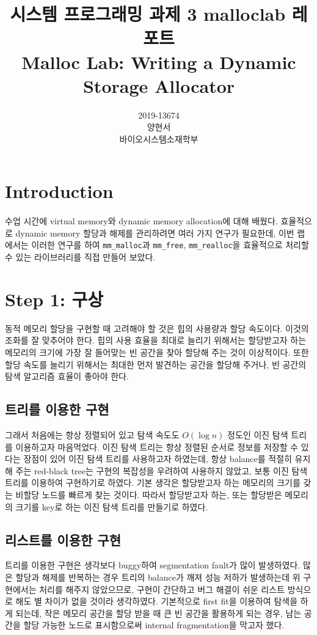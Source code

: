 \documentclass{report}
\title{시스템 프로그래밍 과제 3 malloclab 레포트 \\
\large Malloc Lab: Writing a Dynamic Storage Allocator}
\date{}
\author{
  2019-13674\\
  양현서 \\
  바이오시스템소재학부\\
}
\begin{document}
\maketitle
\tableofcontents

\section{Introduction}
\paragraph{}
 수업 시간에 virtual memory와 dynamic memory allocation에 대해 배웠다. 효율적으로 dynamic memory 할당과 해제를 관리하려면 여러 가지 연구가 필요한데, 이번 랩에서는 이러한 연구를 하여 \lstinline{mm_malloc}과 \lstinline{mm_free}, \lstinline{mm_realloc}을 효율적으로 처리할 수 있는 라이브러리를 직접 만들어 보았다.

\section{Step 1: 구상}
동적 메모리 할당을 구현할 때 고려해야 할 것은 힙의 사용량과 할당 속도이다. 이것의 조화를 잘 맞추어야 한다. 힙의 사용 효율을 최대로 늘리기 위해서는 할당받고자 하는 메모리의 크기에 가장 잘 들어맞는 빈 공간을 찾아 할당해 주는 것이 이상적이다. 또한 할당 속도를 늘리기 위해서는 최대한 먼저 발견하는 공간을 할당해 주거나, 빈 공간의 탐색 알고리즘 효율이 좋아야 한다.
\subsection{트리를 이용한 구현}
그래서 처음에는 항상 정렬되어 있고 탐색 속도도 $O(\log n)$ 정도인 이진 탐색 트리를 이용하고자 마음먹었다. 이진 탐색 트리는 항상 정렬된 순서로 정보를 저장할 수 있다는 장점이 있어 이진 탐색 트리를 사용하고자 하였는데, 항상 balance를 적절히 유지해 주는 red-black tree는 구현의 복잡성을 우려하여 사용하지 않았고, 보통 이진 탐색 트리를 이용하여 구현하기로 하였다. 기본 생각은 할당받고자 하는 메모리의 크기를 갖는 비할당 노드를 빠르게 찾는 것이다. 따라서 할당받고자 하는, 또는 할당받은 메모리의 크기를 key로 하는 이진 탐색 트리를 만들기로 하였다.
\subsection{리스트를 이용한 구현}
트리를 이용한 구현은 생각보다 buggy하여 segmentation fault가 많이 발생하였다. 많은 할당과 해제를 반복하는 경우 트리의 balance가 깨져 성능 저하가 발생하는데 위 구현에서는 처리를 해주지 않았으므로, 구현이 간단하고 버그 해결이 쉬운 리스트 방식으로 해도 별 차이가 없을 것이라 생각하였다. 기본적으로 first fit을 이용하여 탐색을 하게 되는데, 작은 메모리 공간을 할당 받을 때 큰 빈 공간을 활용하게 되는 경우, 남는 공간을 할당 가능한 노드로 표시함으로써 internal fragmentation을 막고자 했다.
\end{document}
